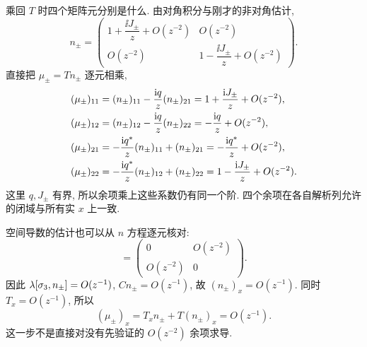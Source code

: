 \par\smallskip\noindent 乘回 $ T$ 时四个矩阵元分别是什么.\quad
由对角积分与刚才的非对角估计,
\begin{equation*}
n_\pm=\begin{pmatrix}
1+\dfrac{\ii J_\pm}{z}+O(z^{-2})&O(z^{-2})\\
O(z^{-2})&1-\dfrac{\ii J_\pm}{z}+O(z^{-2})
\end{pmatrix}.
\end{equation*}
直接把 $\mu_\pm= Tn_\pm$ 逐元相乘,
\begin{align*}
(\mu_\pm)_{11}
&=(n_\pm)_{11}-\dfrac{\mathrm{i} q}{z}(n_\pm)_{21}
=1+\dfrac{\mathrm{i} J_\pm}{z}+O(z^{-2}),\\
(\mu_\pm)_{12}
&=(n_\pm)_{12}-\dfrac{\mathrm{i} q}{z}(n_\pm)_{22}
=-\dfrac{\mathrm{i} q}{z}+O(z^{-2}),\\
(\mu_\pm)_{21}
&=-\dfrac{\mathrm{i}{q}^{*}}{z}(n_\pm)_{11}+(n_\pm)_{21}
=-\dfrac{\mathrm{i}{q}^{*}}{z}+O(z^{-2}),\\
(\mu_\pm)_{22}
&=-\dfrac{\mathrm{i}{q}^{*}}{z}(n_\pm)_{12}+(n_\pm)_{22}
=1-\dfrac{\mathrm{i} J_\pm}{z}+O(z^{-2}).
\end{align*}
这里 $q,J_\pm$ 有界, 所以余项乘上这些系数仍有同一个阶.
四个余项在各自解析列允许的闭域与所有实 $x$ 上一致.

空间导数的估计也可以从 $n$ 方程逐元核对:
\begin{equation*}
[\sg,n_\pm]=\begin{pmatrix}0&O(z^{-2})\\O(z^{-2})&0\end{pmatrix}.
\end{equation*}
因此 $\lambda[\sigma_3,n_\pm]=O(z^{-1})$,
$ Cn_\pm=O(z^{-1})$, 故 $(n_\pm)_x=O(z^{-1})$.
同时 $ T_x=O(z^{-1})$, 所以
\begin{equation*}
(\mu_\pm)_x= T_xn_\pm+ T(n_\pm)_x=O(z^{-1}).
\end{equation*}
这一步不是直接对没有先验证的 $O(z^{-2})$ 余项求导.

